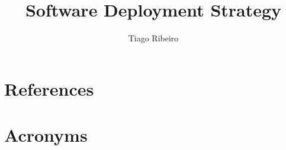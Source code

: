 \documentclass[TS,authoryear,toc]{lsstdoc}
\title{Software Deployment Strategy}
\author{%
Tiago Ribeiro
}
\date{\vcsDate}
\begin{document}
\maketitle


\appendix
\section{References} \label{sec:bib}


\section{Acronyms} \label{sec:acronyms}

\end{document}
